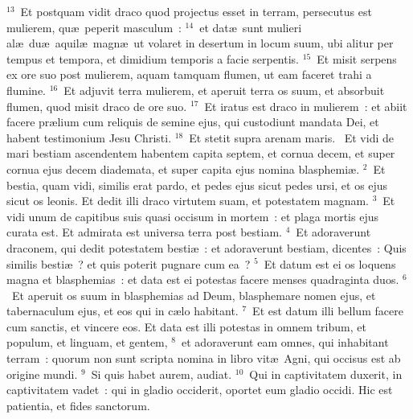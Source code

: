 ${}^{13}$~Et postquam vidit draco quod projectus esset in terram, persecutus est mulierem, qu\ae\ peperit masculum~:
${}^{14}$~et dat\ae\ sunt mulieri al\ae\ du\ae\ aquil\ae\ magn\ae\ ut volaret in desertum in locum suum, ubi alitur per tempus et tempora, et dimidium temporis a facie serpentis.
${}^{15}$~Et misit serpens ex ore suo post mulierem, aquam tamquam flumen, ut eam faceret trahi a flumine.
${}^{16}$~Et adjuvit terra mulierem, et aperuit terra os suum, et absorbuit flumen, quod misit draco de ore suo.
${}^{17}$~Et iratus est draco in mulierem~: et abiit facere pr\ae lium cum reliquis de semine ejus, qui custodiunt mandata Dei, et habent testimonium Jesu Christi.
${}^{18}$~Et stetit supra arenam maris.
~\lettrine[lines=10,image=true,loversize=0.05,lraise=-0.03]{E}{}t vidi de mari bestiam ascendentem habentem capita septem, et cornua decem, et super cornua ejus decem diademata, et super capita ejus nomina blasphemi\ae .
${}^{2}$~Et bestia, quam vidi, similis erat pardo, et pedes ejus sicut pedes ursi, et os ejus sicut os leonis. Et dedit illi draco virtutem suam, et potestatem magnam.
${}^{3}$~Et vidi unum de capitibus suis quasi occisum in mortem~: et plaga mortis ejus curata est. Et admirata est universa terra post bestiam.
${}^{4}$~Et adoraverunt draconem, qui dedit potestatem besti\ae~: et adoraverunt bestiam, dicentes~: Quis similis besti\ae~? et quis poterit pugnare cum ea~?
${}^{5}$~Et datum est ei os loquens magna et blasphemias~: et data est ei potestas facere menses quadraginta duos.
${}^{6}$~Et aperuit os suum in blasphemias ad Deum, blasphemare nomen ejus, et tabernaculum ejus, et eos qui in c\ae lo habitant.
${}^{7}$~Et est datum illi bellum facere cum sanctis, et vincere eos. Et data est illi potestas in omnem tribum, et populum, et linguam, et gentem,
${}^{8}$~et adoraverunt eam omnes, qui inhabitant terram~: quorum non sunt scripta nomina in libro vit\ae\ Agni, qui occisus est ab origine mundi.
${}^{9}$~Si quis habet aurem, audiat.
${}^{10}$~Qui in captivitatem duxerit, in captivitatem vadet~: qui in gladio occiderit, oportet eum gladio occidi. Hic est patientia, et fides sanctorum.


